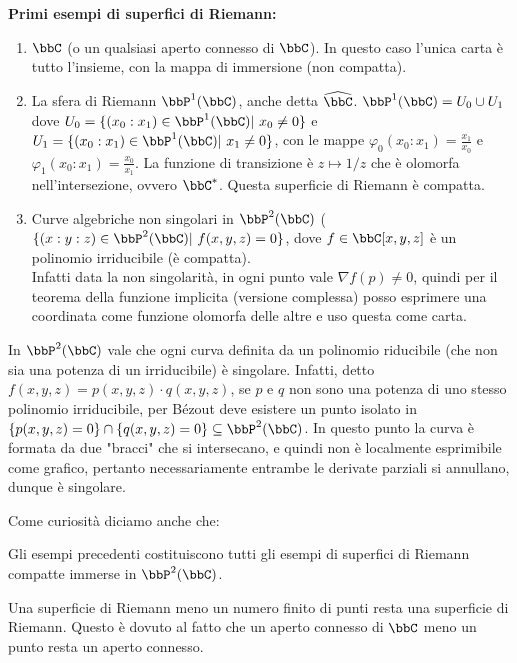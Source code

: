 \textbf{Primi esempi di superfici di Riemann:}
\begin{enumerate}
  \item $\bbC$ (o un qualsiasi aperto connesso di $\bbC$). In questo caso l'unica carta è tutto l'insieme, con la mappa di immersione (non compatta).
  \item La sfera di Riemann $\bbP^1(\bbC)$, anche detta $\hat\bbC$. $\bbP^1(\bbC)=U_0\cup U_1$ dove $U_0=\{(x_0:x_1)\in \bbP^1(\bbC) | \ x_0\neq 0\}$ e $U_1=\{(x_0:x_1)\in \bbP^1(\bbC) | \ x_1\neq 0\}$, con le mappe $\varphi_0(x_0:x_1)=\frac{x_1}{x_0}$ e $\varphi_1(x_0:x_1)=\frac{x_0}{x_1}$. La funzione di transizione è $z\mapsto 1/z$ che è olomorfa nell'intersezione, ovvero $\bbC^\ast$. Questa superficie di Riemann è compatta.
  \item Curve algebriche non singolari in $\bbP^2(\bbC)$ ($\{(x:y:z)\in \bbP^2(\bbC) | \ f(x,y,z)=0\}$, dove $f\in \bbC[x,y,z]$ è un polinomio irriducibile (è compatta).\\
  Infatti data la non singolarità, in ogni punto vale $\nabla f(p)\neq0$, quindi per il teorema della funzione implicita (versione complessa) posso esprimere una coordinata come funzione olomorfa delle altre e uso questa come carta.
\end{enumerate}
\begin{osservazione}
    In $\bbP^2(\bbC)$ vale che ogni curva definita da un polinomio riducibile (che non sia una potenza di un irriducibile) è singolare. Infatti, detto $f(x,y,z)=p(x,y,z)\cdot q(x,y,z)$, se $p$ e $q$ non sono una potenza di uno stesso polinomio irriducibile, per Bézout deve esistere un punto isolato in $\{p(x,y,z)=0\}\cap\{q(x,y,z)=0\}\subseteq \bbP^2(\bbC)$. In questo punto la curva è formata da due "bracci" che si intersecano, e quindi non è localmente esprimibile come grafico, pertanto necessariamente entrambe le derivate parziali si annullano, dunque è singolare. %
\end{osservazione}

Come curiosità diciamo anche che:
\begin{divagazione}[di Chow]
    Gli esempi precedenti costituiscono tutti gli esempi di superfici di Riemann compatte immerse in $\bbP^2(\bbC)$.
\end{divagazione}
\begin{osservazione}
    Una superficie di Riemann meno un numero finito di punti resta una superficie di Riemann. Questo è dovuto al fatto che un aperto connesso di $\bbC$ meno un punto resta un aperto connesso.
\end{osservazione}


